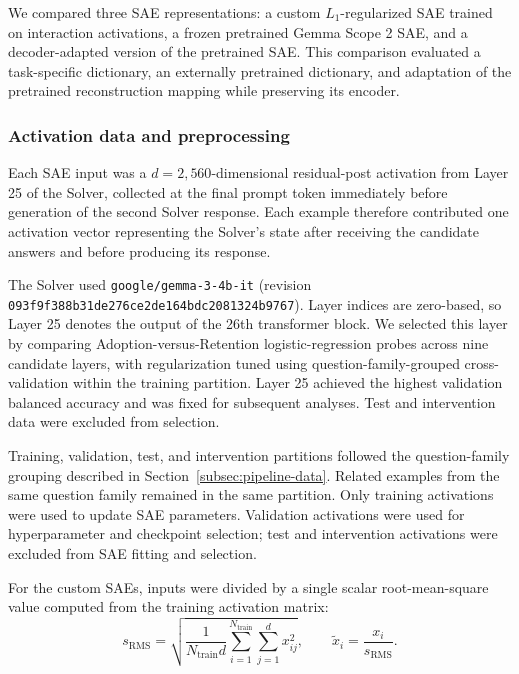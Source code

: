 \documentclass[pdflatex,sn-mathphys-num]{sn-jnl}
\theoremstyle{thmstylethree}%
\begin{document}
We compared three SAE representations: a custom $L_1$-regularized
SAE trained on interaction activations, a frozen pretrained
Gemma Scope 2 SAE, and a decoder-adapted version of the pretrained
SAE. This comparison evaluated a task-specific dictionary,
an externally pretrained dictionary, and adaptation of the
pretrained reconstruction mapping while preserving its encoder.

\subsubsection{Activation data and preprocessing}

Each SAE input was a $d=2{,}560$-dimensional residual-post activation from Layer 25 of the Solver, collected at the final prompt token immediately
before generation of the second Solver response. Each example therefore contributed one activation vector representing the Solver's state after receiving
the candidate answers and before producing its response.

The Solver used \texttt{google/gemma-3-4b-it} \cite{gemmateam2025gemma3} (revision \texttt{093f9f388b31de276ce2de164bdc2081324b9767}). Layer indices are zero-based, so Layer 25
denotes the output of the 26th transformer block. We selected this layer by comparing Adoption-versus-Retention logistic-regression probes \cite{alain2016probes} across nine 
candidate layers, with regularization tuned using question-family-grouped cross-validation within the training partition. Layer 25 achieved 
the highest validation balanced accuracy and was fixed for subsequent analyses. Test and intervention data were excluded from selection.

Training, validation, test, and intervention partitions followed the question-family grouping described in Section~\ref{subsec:pipeline-data}. Related examples
from the same question family remained in the same partition. Only training activations were used to update SAE parameters. Validation activations
were used for hyperparameter and checkpoint selection; test and intervention activations were excluded from SAE fitting and selection.

For the custom SAEs, inputs were divided by a single scalar root-mean-square value computed from the training activation matrix:
\begin{equation}
s_{\mathrm{RMS}}
=
\sqrt{
\frac{1}{N_{\mathrm{train}}d}
\sum_{i=1}^{N_{\mathrm{train}}}
\sum_{j=1}^{d} x_{ij}^{2}
},
\qquad
\tilde{x}_i = \frac{x_i}{s_{\mathrm{RMS}}}.
\end{equation}
\end{document}
